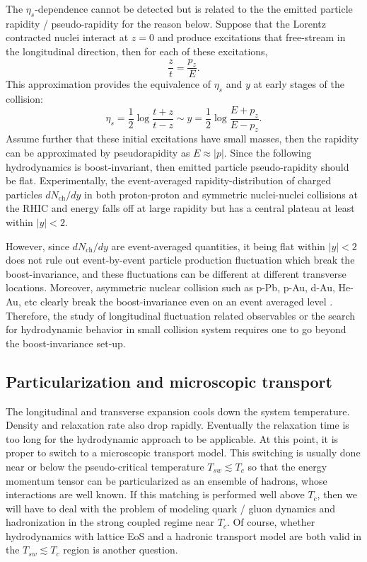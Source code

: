 The $\eta_s$-dependence cannot be detected but is related to the the emitted particle rapidity / pseudo-rapidity for the reason below.
Suppose that the Lorentz contracted nuclei interact at $z=0$ and produce excitations that free-stream in the longitudinal direction, then for each of these excitations,
\begin{equation}
  \frac{z}{t} = \frac{p_z}{E}.
\end{equation}
This approximation provides the equivalence of $\eta_s$ and $y$ at early stages of the collision:
\begin{equation}
  \eta_s = \frac{1}{2}\log\frac{t+z}{t-z} \sim y = \frac{1}{2}\log\frac{E+p_z}{E-p_z}.
\end{equation}
Assume further that these initial excitations have small masses, then the rapidity can be approximated by pseudorapidity as $E\approx |p|$.
Since the following hydrodynamics is boost-invariant, then emitted particle pseudo-rapidity should be flat.
Experimentally, the event-averaged rapidity-distribution of charged particles $dN_{\textrm{ch}}/dy$ in both proton-proton and symmetric nuclei-nuclei collisions at the RHIC and energy falls off at large rapidity but has a central plateau at least within $|y|<2$.

However, since $dN_{\textrm{ch}}/dy$ are event-averaged quantities, it being flat within $|y|<2$ does not rule out event-by-event particle production fluctuation which break the boost-invariance, and these fluctuations can be different at different transverse locations.
Moreover, asymmetric nuclear collision such as p-Pb, p-Au, d-Au, He-Au, etc clearly break the boost-invariance even on an event averaged level 
\cite{Abelev:2014mda, Aad:2014lta, Aad:2013fja, CMS:2012qk, Chatrchyan:2013nka, Khachatryan:2015waa, Khachatryan:2015oea, Khachatryan:2016ibd, Adare:2014keg, Adare:2015cpn, Adare:2018toe}.
Therefore, the study of longitudinal fluctuation related observables or the search for hydrodynamic behavior in small collision system requires one to go beyond the boost-invariance set-up.

\subsection{Particularization and microscopic transport}
The longitudinal and transverse expansion cools down the system temperature. 
Density and relaxation rate also drop rapidly.
Eventually the relaxation time is too long for the hydrodynamic approach to be applicable.
At this point, it is proper to switch to a microscopic transport model.
This switching is usually done near or below the pseudo-critical temperature $T_{sw} \lesssim T_c$ so that the energy momentum tensor can be particularized as an ensemble of hadrons, whose interactions are well known.
If this matching is performed well above $T_c$, then we will have to deal with the problem of modeling quark / gluon dynamics and hadronization in the strong coupled regime near $T_c$.
Of course, whether hydrodynamics with lattice EoS and a hadronic transport model are both valid in the $T_{sw} \lesssim T_c$ region is another question.

